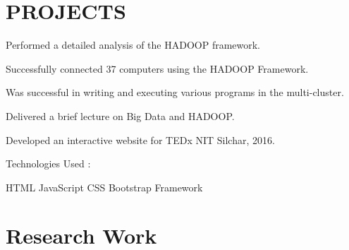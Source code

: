 \documentclass[]{deedy-resume-openfont}
\begin{document}
\begin{minipage}[t]{0.66\textwidth} 


\section{PROJECTS}




\vspace{\topsep} %
\begin{tightemize}
    \item Performed a detailed analysis of the HADOOP framework.
    \item Successfully connected 37 computers using the HADOOP Framework.
    \item Was successful in writing and executing various programs in the multi-cluster.
    \item Delivered a brief lecture on Big Data and HADOOP.
\end{tightemize}
\sectionsep


\vspace{\topsep} %
\begin{tightemize}
    \item Developed an interactive website for TEDx NIT Silchar, 2016.
    \item Technologies Used : 
    \vspace{\topsep}
        \begin{tightemize}
            HTML \textbullet{}JavaScript \textbullet{}CSS \textbullet{} Bootstrap Framework
        \end{tightemize}
\end{tightemize}
\sectionsep



\section{Research Work}


\end{minipage}
\end{document}
